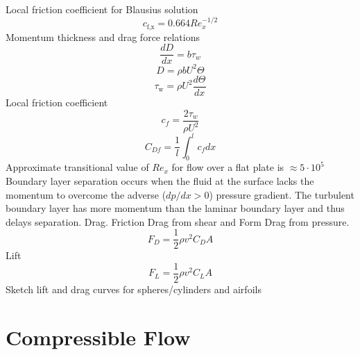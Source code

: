 \documentclass{article}
\begin{document}
Local friction coefficient for Blausius solution
\begin{equation}
  c_\text{f,x} = 0.664 Re_x^{-1/2}
\end{equation}
\newline
\newline
Momentum thickness and drag force relations
\begin{equation}
  \frac{dD}{dx} = b \tau_w
\end{equation}
\begin{equation}
  D = \rho b U^2 \Theta
\end{equation}
\begin{equation}
  \tau_\text{w} = \rho U^2 \frac{d \Theta}{d x}
\end{equation}
\newline
\newline
Local friction coefficient
\begin{equation}
  c_f = \frac{2\tau_w}{\rho U^2}
\end{equation}
\begin{equation}
  C_{Df} = \frac{1}{l}\int_0^l c_f dx
\end{equation}
\newline
\newline
Approximate transitional value of $Re_x$ for flow over a flat plate is $\approx 5 \cdot 10^5$
Boundary layer separation occurs when the fluid at the surface lacks the momentum to overcome the adverse ($dp/dx > 0$) pressure gradient. The turbulent boundary layer has more momentum than the laminar boundary layer and thus delays separation.
\newline
\newline
Drag. Friction Drag from shear and Form Drag from pressure. 
\begin{equation}
  F_D = \frac{1}{2}\rho v^2 C_D A
\end{equation}
\newline
\newline
Lift
\begin{equation}
  F_L = \frac{1}{2}\rho v^2 C_L A
\end{equation}
\newline
\newline
Sketch lift and drag curves for spheres/cylinders and airfoils


%
%
\newpage
\section{Compressible Flow}
\end{document}
